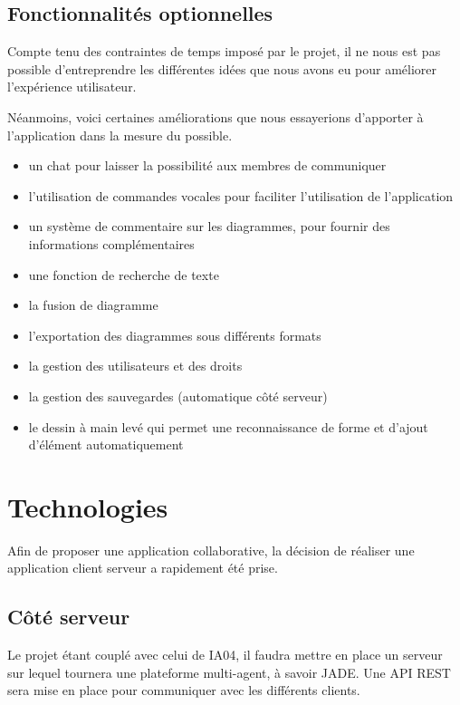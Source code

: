 \documentclass[a4paper,11pt]{article}
\begin{document}
\subsection{Fonctionnalités optionnelles}
Compte tenu des contraintes de temps imposé par le projet, il ne nous est pas possible d'entreprendre les différentes idées que nous avons eu pour améliorer l'expérience utilisateur.

Néanmoins, voici certaines améliorations que nous essayerions d'apporter à l'application dans la mesure du possible.

\begin{itemize}
\item un chat pour laisser la possibilité aux membres de communiquer
\item l’utilisation de commandes vocales pour faciliter l’utilisation de l’application
\item un système de commentaire sur les diagrammes, pour fournir des informations complémentaires
\item une fonction de recherche de texte
\item la fusion de diagramme
\item l’exportation des diagrammes sous différents formats
\item la gestion des utilisateurs et des droits
\item la gestion des sauvegardes (automatique côté serveur)
\item le dessin à main levé qui permet une reconnaissance de forme et d’ajout d’élément automatiquement

\end{itemize}


\section{Technologies}
Afin de proposer une application collaborative, la décision de réaliser une application client serveur a rapidement été prise.

\subsection{Côté serveur}
Le projet étant couplé avec celui de IA04, il faudra mettre en place un serveur sur lequel tournera une plateforme multi-agent, à savoir JADE. 
Une API REST sera mise en place pour communiquer avec les différents clients.
\end{document}
